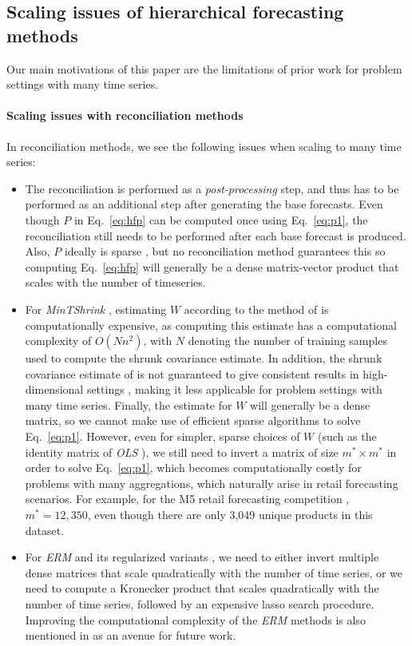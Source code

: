 \documentclass[preprint, 3p, times, twocolumn]{elsarticle}
\begin{document}
\subsection{Scaling issues of hierarchical forecasting methods} \label{subsec:ourwork}

Our main motivations of this paper are the limitations of prior work for problem settings with many time series.

\paragraph{Scaling issues with reconciliation methods} \label{sec:scalingissuesreconmethods}
In reconciliation methods, we see the following issues when scaling to many time series:
\begin{itemize}
  \item The reconciliation is performed as a \textit{post-processing} step, and thus has to be performed as an additional step after generating the base forecasts. Even though \(P\) in Eq.~\ref{eq:hfp} can be computed once using Eq.~\eqref{eq:p1}, the reconciliation still needs to be performed after each base forecast is produced. Also, \(P\) ideally is sparse \cite{bentaieb_regularized_2019}, but no reconciliation method guarantees this so computing Eq.~\ref{eq:hfp} will generally be a dense matrix-vector product that scales with the number of timeseries.
  \item For \textit{MinTShrink} \cite{wickramasuriya_optimal_2019}, estimating \(W\) according to the method of \cite{schafer_shrinkage_2005} is computationally expensive, as computing this estimate has a computational complexity of \(O(Nn^2)\), with \(N\) denoting the number of training samples used to compute the shrunk covariance estimate. In addition, the shrunk covariance estimate of \cite{schafer_shrinkage_2005} is not guaranteed to give consistent results in high-dimensional settings \cite{touloumis_nonparametric_2015}, making it less applicable for problem settings with many time series. Finally, the estimate for \(W\) will generally be a dense matrix, so we cannot make use of efficient sparse algorithms to solve Eq.~\eqref{eq:p1}. However, even for simpler, sparse choices of \(W\) (such as the identity matrix of \textit{OLS} \cite{hyndman_optimal_2011}), we still need to invert a matrix of size \(m^* \times m^*\) in order to solve Eq.~\eqref{eq:p1}, which becomes computationally costly for problems with many aggregations, which naturally arise in retail forecasting scenarios. For example, for the M5 retail forecasting competition \cite{makridakis_m5_2021}, \(m^*=12,350\), even though there are only 3,049 unique products in this dataset.  
  \item For \textit{ERM} and its regularized variants \cite{bentaieb_regularized_2019}, we need to either invert multiple dense matrices that scale quadratically with the number of time series, or we need to compute a Kronecker product that scales quadratically with the number of time series, followed by an expensive lasso search procedure. Improving the computational complexity of the \textit{ERM} methods is also mentioned in \cite{bentaieb_regularized_2019} as an avenue for future work.
\end{itemize}
\end{document}
